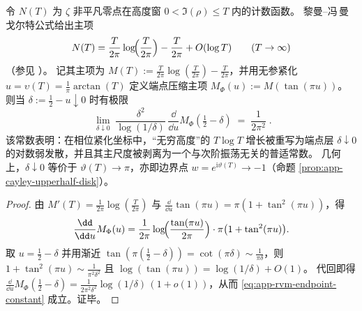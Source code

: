 

\begin{remark}\label{rem:app-rvm-endpoint-constant}
令 \(N(T)\) 为 \(\zeta\) 非平凡零点在高度窗 \(0<\Im(\rho)\le T\) 内的计数函数。
黎曼--冯\,曼戈尔特公式给出主项
\[
N(T)=\frac{T}{2\pi}\log\!\Bigl(\frac{T}{2\pi}\Bigr)-\frac{T}{2\pi}+O(\log T)\qquad(T\to\infty)
\]
（参见 \cite{Apostol1976}）。
记其主项为
\(
M(T):=\frac{T}{2\pi}\log(\frac{T}{2\pi})-\frac{T}{2\pi}
\)，并用无参紧化 \(u=\upsilon(T)=\frac{1}{\pi}\arctan(T)\) 定义端点压缩主项
\(
M_{\Phi}(u):=M(\tan(\pi u))
\)。
则当 \(\delta:=\tfrac12-u\downarrow 0\) 时有极限
\begin{equation}\label{eq:app-rvm-endpoint-constant}
\boxed{\;
\lim_{\delta\downarrow 0}\;
\frac{\delta^{2}}{\log(1/\delta)}\,
\frac{\dd}{\dd u}M_{\Phi}\!\left(\tfrac12-\delta\right)
\;=\;\frac{1}{2\pi^{2}}\; }.
\end{equation}
该常数表明：在相位紧化坐标中，“无穷高度”的 \(T\log T\) 增长被重写为端点层 \(\delta\downarrow 0\) 的对数弱发散，并且其主尺度被剥离为一个与次阶振荡无关的普适常数。
几何上，\(\delta\downarrow 0\) 等价于 \(\vartheta(T)\to\pi\)，亦即边界点 \(w=e^{\mathrm{i}\vartheta(T)}\to-1\)（命题 \ref{prop:app-cayley-upperhalf-disk}）。
\end{remark}
\begin{proof}
由 \(M'(T)=\frac{1}{2\pi}\log(\frac{T}{2\pi})\) 与 \(\frac{\dd}{\dd u}\tan(\pi u)=\pi(1+\tan^2(\pi u))\)，得
\[
\frac{\dd}{\dd u}M_{\Phi}(u)
=\frac{1}{2\pi}\log\!\Bigl(\frac{\tan(\pi u)}{2\pi}\Bigr)\cdot \pi\bigl(1+\tan^2(\pi u)\bigr).
\]
取 \(u=\tfrac12-\delta\) 并用渐近 \(\tan(\pi(\tfrac12-\delta))=\cot(\pi\delta)\sim \frac{1}{\pi\delta}\)，则
\(
1+\tan^2(\pi u)\sim \frac{1}{\pi^2\delta^2}
\)
且
\(
\log(\tan(\pi u))=\log(1/\delta)+O(1)
\)。
代回即得
\(
\frac{\dd}{\dd u}M_{\Phi}(\tfrac12-\delta)
=\frac{1}{2\pi^{2}\delta^{2}}\log(1/\delta)\,(1+o(1))
\)，从而 \eqref{eq:app-rvm-endpoint-constant} 成立。证毕。
\end{proof}

